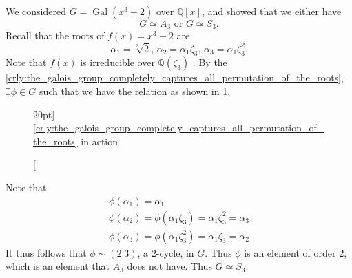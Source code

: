 \documentclass[notoc,notitlepage]{tufte-book}
\DeclareMathOperator{\Gal}{Gal}
\begin{document}
\begin{eg}
  We considered $G = \Gal(x^3 - 2)$ over $\mathbb{Q}[x]$, and showed that we
  either have
  \begin{equation*}
    G \simeq A_3 \text{ or } G \simeq S_3.
  \end{equation*}
  Recall that the roots of $f(x) = x^3 - 2$ are
  \begin{equation*}
    \alpha_1 = \sqrt[3]{2}, \, \alpha_2 = \alpha_1 \zeta_3, \, \alpha_3 =
    \alpha_1 \zeta_3^2.
  \end{equation*}
  Note that $f(x)$ is irreducible over $\mathbb{Q}(\zeta_3)$ . By the
  \cref{crly:the_galois_group_completely_captures_all_permutation_of_the_roots},
  $\exists \phi \in G$ such that we have the relation as shown in
  \cref{fig:crly_galois_group_has_all_permutations_in_action}.
  \begin{figure}[ht]
    \centering
    \caption[][20pt]{\cref{crly:the_galois_group_completely_captures_all_permutation_of_the_roots} in action}
    \label{fig:crly_galois_group_has_all_permutations_in_action}
  \end{figure}

   Note that
  \begin{gather*}
    \phi(\alpha_1) = \alpha_1 \\
    \phi(\alpha_2) = \phi(\alpha_1 \zeta_3) = \alpha_1 \zeta_3^2 = \alpha_3 \\
    \phi(\alpha_3) = \phi(\alpha_1 \zeta_3^2) = \alpha_1 \zeta_3 = \alpha_2
  \end{gather*}
  It thus follows that $\phi \sim (2 \; 3)$, a $2$-cycle, in $G$. Thus $\phi$ is
  an element of order $2$, which is an element that $A_3$ does not have. Thus $G
  \simeq S_3$.
\end{eg}
\end{document}
